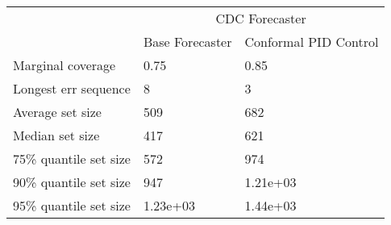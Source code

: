 \begin{tabular}{lll}
\toprule
& \multicolumn{2}{c}{CDC Forecaster} \\
& Base Forecaster & Conformal PID Control \\
\midrule
Marginal coverage & 0.75 & 0.85 \\
Longest err sequence & 8 & 3 \\
Average set size & 509 & 682 \\
Median set size & 417 & 621 \\
75\% quantile set size & 572 & 974 \\
90\% quantile set size & 947 & 1.21e+03 \\
95\% quantile set size & 1.23e+03 & 1.44e+03 \\
\bottomrule
\end{tabular}
